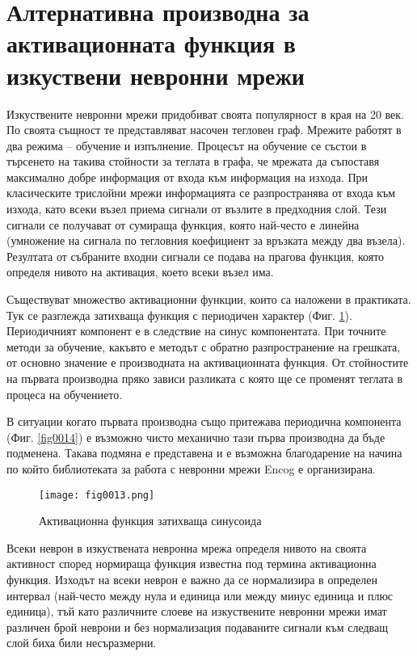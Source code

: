\section{Алтернативна производна за активационната функция в изкуствени невронни мрежи}

Изкуствените невронни мрежи придобиват своята популярност в края на 20 век. По своята същност те представляват насочен тегловен граф. Мрежите работят в два режима – обучение и изпълнение. Процесът на обучение се състои в търсенето на такива стойности за теглата в графа, че мрежата да съпоставя максимално добре информация от входа към информация на изхода. При класическите трислойни мрежи информацията се разпространява от входа към изхода, като всеки възел приема сигнали от възлите в предходния слой. Тези сигнали се получават от сумираща функция, която най-често е линейна (умножение на сигнала по тегловния коефициент за връзката между два възела). Резултата от събраните входни сигнали се подава на прагова функция, която определя нивото на активация, което всеки възел има.

Съществуват множество активационни функции, които са наложени в практиката. Тук се разглежда затихваща функция с периодичен характер (Фиг. \ref{fig0013}). Периодичният компонент е в следствие на синус компонентата. При точните методи за обучение, какъвто е методът с обратно разпространение на грешката, от основно значение е производната на активационната функция. От стойностите на първата производна пряко зависи разликата с която ще се променят теглата в процеса на обучението.

В ситуации когато първата производна също притежава периодична компонента (Фиг. \ref{fig0014}) е възможно чисто механично тази първа производна да бъде подменена. Такава подмяна е представена и е възможна благодарение на начина по който библиотеката за работа с невронни мрежи Encog е организирана.

\begin{figure}[H]
  \centering
  \texttt{[image: fig0013.png]}
  \caption{Активационна функция затихваща синусоида}
\label{fig0013}
\end{figure}

Всеки неврон в изкуствената невронна мрежа определя нивото на своята активност според нормираща функция известна под термина активационна функция. Изходът на всеки неврон е важно да се нормализира в определен интервал (най-често между нула и единица или между минус единица и плюс единица), тъй като различните слоеве на изкуствените невронни мрежи имат различен брой неврони и без нормализация подаваните сигнали към следващ слой биха били несъразмерни.

